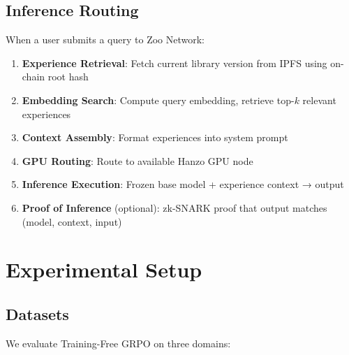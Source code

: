 \documentclass[11pt,a4paper]{article}
\begin{document}
\subsection{Inference Routing}

When a user submits a query to Zoo Network:

\begin{enumerate}
    \item \textbf{Experience Retrieval}: Fetch current library version from IPFS using on-chain root hash
    \item \textbf{Embedding Search}: Compute query embedding, retrieve top-$k$ relevant experiences
    \item \textbf{Context Assembly}: Format experiences into system prompt
    \item \textbf{GPU Routing}: Route to available Hanzo GPU node
    \item \textbf{Inference Execution}: Frozen base model + experience context → output
    \item \textbf{Proof of Inference} (optional): zk-SNARK proof that output matches (model, context, input)
\end{enumerate}

\section{Experimental Setup}

\subsection{Datasets}

We evaluate Training-Free GRPO on three domains:
\end{document}
